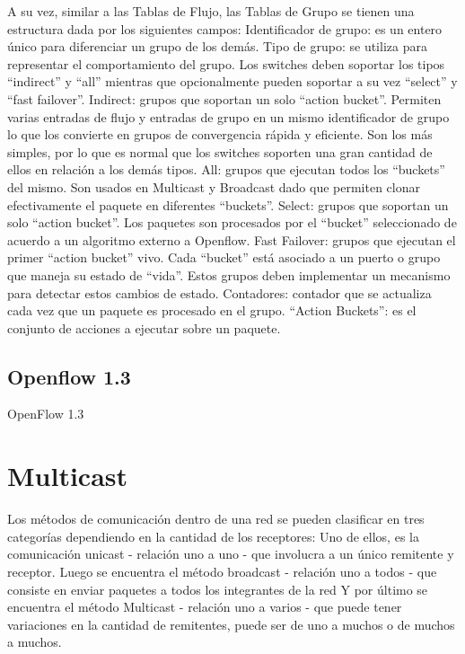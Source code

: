 \documentclass[12pt,a4paper,oneside]{book}
\begin{document}
	A su vez, similar a las Tablas de Flujo, las Tablas de Grupo se tienen una estructura dada por los siguientes campos:
Identificador de grupo: es un entero único para diferenciar un grupo de los demás.
Tipo de grupo: se utiliza para representar el comportamiento del grupo. Los switches deben soportar los tipos “indirect” y “all” mientras que opcionalmente pueden soportar a su vez “select” y “fast failover”.
Indirect: grupos que soportan un solo “action bucket”. Permiten varias entradas de flujo y entradas de grupo en un mismo identificador de grupo lo que los convierte en grupos de convergencia rápida y  eficiente. Son los más simples, por lo que es normal que los switches soporten una gran cantidad de ellos en relación a los demás tipos.
All: grupos que ejecutan todos los “buckets” del mismo. Son usados en Multicast y Broadcast dado que permiten clonar efectivamente el paquete en diferentes “buckets”.
Select: grupos que soportan un solo “action bucket”. Los paquetes son procesados por el “bucket” seleccionado de acuerdo a un algoritmo externo a Openflow.
Fast Failover: grupos que ejecutan el primer “action bucket” vivo. Cada “bucket” está asociado a un puerto o grupo que maneja su estado de “vida”. Estos grupos deben implementar un mecanismo para detectar estos cambios de estado.
Contadores: contador que se actualiza cada vez que un paquete es procesado en el grupo.
“Action Buckets”: es el conjunto de acciones a ejecutar sobre un paquete.

\subsection{Openflow 1.3}
\label{openflow13}

OpenFlow 1.3

\section{Multicast}
\label{marco_multicast}

Los métodos de comunicación dentro de una red se pueden clasificar en tres categorías dependiendo en la cantidad de los receptores:
Uno de ellos, es  la comunicación unicast - relación uno a uno - que involucra a un único remitente y receptor. 
Luego se encuentra el método broadcast - relación uno a todos - que consiste en enviar paquetes a todos los integrantes de la red 
Y por último se encuentra el  método Multicast - relación uno a varios - que puede tener variaciones en la cantidad de remitentes, puede ser de uno a muchos o de muchos a muchos.
\end{document}
